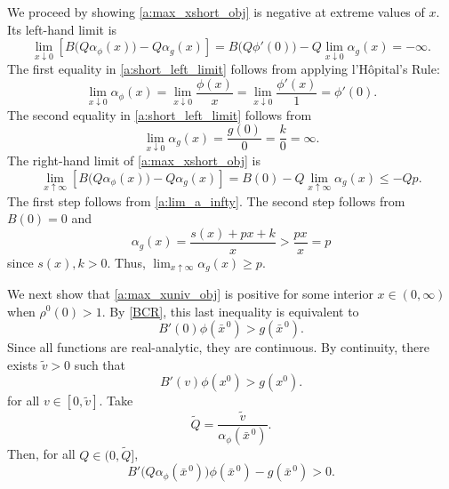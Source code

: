 \documentclass[12pt]{article}
\newcommand{\efficacy}{\phi}
\newcommand{\general}{g}
\newcommand{\benefit}{B}
\newcommand{\ratio}{\rho^0\!}
\newcommand{\xno}{x^{0}}
\newcommand{\xnobar}{\bar{x}^{\,0}}
\newcommand{\perunit}[1]{\alpha_{#1}}
\newcommand{\Qtilde}{\tilde{Q}}
\newcommand{\vtilde}{\tilde{v}}
\begin{document}
We proceed by showing \eqref{a:max_xshort_obj} is negative at extreme
values of $x$.  Its left-hand limit is
\begin{equation}
\label{a:short_left_limit}
\lim_{x \downarrow 0} \left[ \benefit \bigl( Q\perunit{\efficacy}\!(x)
  \bigr) - Q \perunit{\general}\!(x) \right] = \benefit \bigl(
Q\efficacy'(0) \bigr) - Q \lim_{x \downarrow 0}
\perunit{\general}\!(x) = - \infty.
\end{equation}
The first equality in \eqref{a:short_left_limit} follows from applying l'H\^{o}pital's Rule: 
\begin{equation}
\label{a:lHop}
\lim_{x \downarrow 0} \perunit{\efficacy}\!(x) = \lim_{x \downarrow 0}
\frac{\efficacy(x)}{x} = \lim_{x \downarrow 0} \frac{\efficacy'(x)}{1}
= \efficacy'(0).
\end{equation}
The second equality in \eqref{a:short_left_limit} follows from 
\begin{equation}
\label{a:lHop_almost} 
\lim_{x \downarrow 0} \perunit{\general}\!(x) = \frac{\general(0)}{0} = \frac{k}{0} = \infty.
\end{equation}
The right-hand limit of \eqref{a:max_xshort_obj} is
\begin{equation}
 \label{a:short_right_limit1}
\lim_{x \uparrow \infty} \left[ \benefit \bigl(
  Q\perunit{\efficacy}\!(x) \bigr) - Q \perunit{\general}\!(x) \right]
= \benefit(0) - Q \lim_{x \uparrow \infty} \perunit{\general}\!(x)
\leq - Qp.
\end{equation}
The first step follows from \eqref{a:lim_a_infty}. The second step
follows from $\benefit(0) = 0$ and
\begin{equation}
\label{a:average_g_limit}
\perunit{\general}(x) = \frac{s(x) + px + k}{x} > \frac{px}{x} = p
\end{equation}
since $s(x), k > 0$. Thus, $\lim_{x \uparrow \infty}
\perunit{\general}\!(x) \geq p$.

We next show that \eqref{a:max_xuniv_obj} is positive for some
interior $x \in (0, \infty)$ when $\ratio(0) > 1$. By \eqref{BCR},
this last inequality is equivalent to
\begin{equation}
\label{a:BCRarrange0}
\benefit'(0) \efficacy(\xnobar) > \general(\xnobar).
\end{equation}
Since all functions are real-analytic, they are continuous. By
continuity, there exists $\vtilde > 0$ such that
\begin{equation}
\label{a:BCRarrangev}
\benefit'(v) \efficacy(\xno) > \general(\xno).
\end{equation}
for all $v \in [0, \vtilde]$. Take 
\begin{equation}
\label{a:Qprime}
\Qtilde = \frac{\vtilde}{\perunit{\efficacy}\!(\xnobar)}.  
\end{equation} 
Then, for all $Q \in (0, \Qtilde]$, 
\begin{equation}
\label{a:greater1}
\benefit' \! \bigl( Q \perunit{\efficacy}\!(\xnobar) \bigr)
\efficacy(\xnobar) - \general(\xnobar) > 0.
\end{equation}
\end{document}
